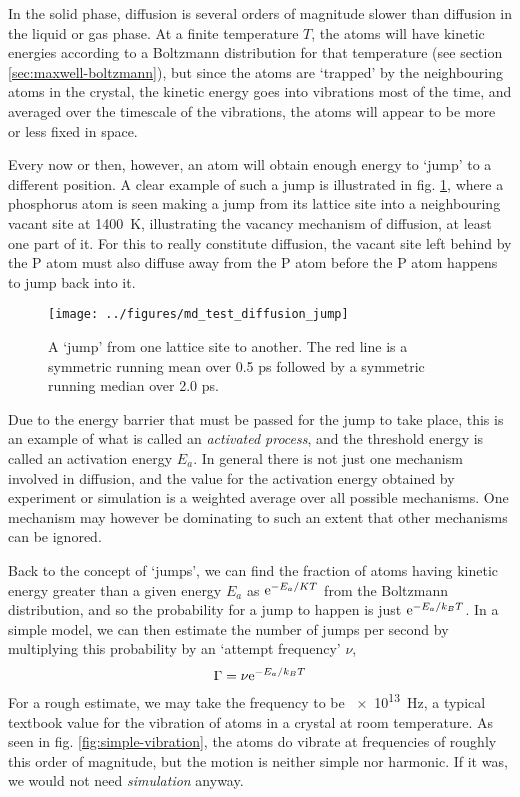 \documentclass[11pt,bibliography=totoc,index=totoc]{scrbook}   %
\begin{document}
In the solid phase, diffusion is several orders of magnitude slower than diffusion in the liquid or gas phase. 
At a finite temperature $T$, the atoms will have kinetic energies according to a Boltzmann distribution for that temperature (see section \ref{sec:maxwell-boltzmann}),
but since the atoms are `trapped' by the neighbouring atoms in the crystal, the kinetic energy goes into vibrations most of the time,
and averaged over the timescale of the vibrations, the atoms will appear to be more or less fixed in space.

Every now or then, however, an atom will obtain enough energy to `jump' to a different position.
A clear example of such a jump is illustrated in fig. \ref{fig:../figures/md_test_diffusion_jump}, 
where a phosphorus atom is seen making a jump from its lattice site into a neighbouring vacant site at 1400~K,
illustrating the vacancy mechanism of diffusion, at least one part of it. 
For this to really constitute diffusion, the vacant site left behind by the P atom 
must also diffuse away from the P atom before the P atom happens to jump back into it.

\begin{figure}[htbp]
  \begin{center}
    \texttt{[image: ../figures/md\_test\_diffusion\_jump]}
  \end{center}
  \caption{A `jump' from one lattice site to another. The red line is a symmetric running mean over 0.5 ps followed by a symmetric running median over 2.0 ps.}
  \label{fig:../figures/md_test_diffusion_jump}
\end{figure}

Due to the energy barrier that must be passed for the jump to take place, 
this is an example of what is called an \emph{activated process}, 
and the threshold energy is called an activation energy $E_a$.
In general there is not just one mechanism involved in diffusion, 
and the value for the activation energy obtained by experiment or simulation is a weighted average over all possible mechanisms.
One mechanism may however be dominating to such an extent that other mechanisms can be ignored.

Back to the concept of `jumps', we can find the fraction of atoms having kinetic energy greater than a given energy $E_a$ 
as $\mathrm{e}^{-E_a/KT}$ from the Boltzmann distribution, 
and so the probability for a jump to happen is just $\mathrm{e}^{-E_a/k_BT}$. 
In a simple model, we can then estimate the number of jumps per second by multiplying this probability by an `attempt frequency' $\nu$,
\begin{equation}
  \Gamma = \nu \mathrm{e}^{-E_a/k_BT}
  \label{eq:jumpfreq-est}
\end{equation}
For a rough estimate, we may take the frequency to be \SI{e13}{\hertz}, 
a typical textbook value for the vibration of atoms in a crystal at room temperature.\cite[212]{Tilley:2004}
As seen in fig. \ref{fig:simple-vibration}, the atoms do vibrate at frequencies of roughly this order of magnitude, 
but the motion is neither simple nor harmonic.
If it was, we would not need \emph{simulation} anyway.
\end{document}
